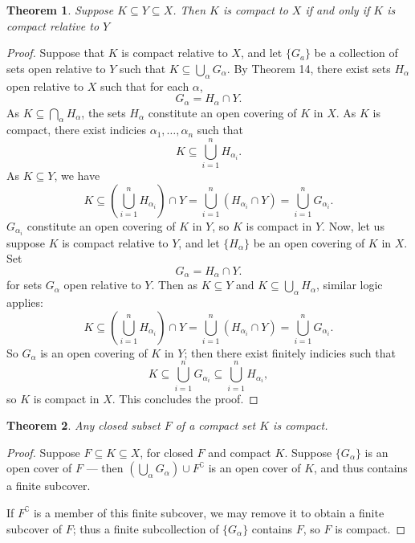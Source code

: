 \documentclass[11pt]{article}
\newtheorem{theorem}{Theorem}
\begin{document}
\begin{adjustwidth}{1cm}{}
	\begin{theorem}
		Suppose $K \subseteq Y \subseteq X$. Then $K$ is compact to $X$ if and only if $K$ is compact relative to $Y$
	\end{theorem}
	\begin{proof}
		Suppose that $K$ is compact relative to $X$, and let $\{ G_{a} \}$ be a collection of sets open relative to $Y$ such that $K \subseteq \bigcup_{\alpha} G_{\alpha}$. By Theorem 14, there exist sets $H_{\alpha}$ open relative to $X$ such that for each $\alpha$,
		\[
			G_{\alpha} = H_{\alpha} \cap Y.
		\]
		As $K \subseteq \bigcap_{\alpha} H_{\alpha}$, the sets $H_{\alpha}$ constitute an open covering of $K$ in $X$. As $K$ is compact, there exist indicies $\alpha_{1}, \ldots, \alpha_{n}$ such that
		\[
			K \subseteq \bigcup\limits_{i = 1}^{n} H_{\alpha_{i}}.
		\]
		As $K \subseteq Y$, we have
		\[
			K \subseteq \left( \bigcup\limits_{i = 1}^{n} H_{\alpha_{i}} \right) \cap Y = \bigcup\limits_{i = 1}^{n} (H_{\alpha_{i}} \cap Y) = \bigcup\limits_{i = 1}^{n} G_{\alpha_{i}}.
		\]
		$G_{\alpha_{i}}$ constitute an open covering of $K$ in $Y$, so $K$ is compact in $Y$. Now, let us suppose $K$ is compact relative to $Y$, and let $\{ H_{\alpha} \}$ be an open covering of $K$ in $X$. Set
		\[
			G_{\alpha} = H_{\alpha} \cap Y.
		\]
		for sets $G_{\alpha}$ open relative to $Y$. Then as $K \subseteq Y$ and $K \subseteq \bigcup_{\alpha} H_{\alpha}$, similar logic applies:
		\[
			K \subseteq \left( \bigcup\limits_{i = 1}^{n} H_{\alpha_{i}} \right) \cap Y = \bigcup\limits_{i = 1}^{n} (H_{\alpha_{i}} \cap Y) = \bigcup\limits_{i = 1}^{n} G_{\alpha_{i}}.
		\]
		So $G_{\alpha}$ is an open covering of $K$ in $Y$; then there exist finitely indicies such that
		\[
			K \subseteq \bigcup\limits_{i = 1}^{n} G_{\alpha_{i}} \subseteq \bigcup\limits_{i = 1}^{n} H_{\alpha_{i}},
		\]
		so $K$ is compact in $X$. This concludes the proof.
	\end{proof}
\end{adjustwidth}

\begin{theorem}
	Any closed subset $F$ of a compact set $K$ is compact.
\end{theorem}
\begin{adjustwidth}{1cm}{}
	\begin{proof}
		Suppose $F \subseteq K \subseteq X$, for closed $F$ and compact $K$. Suppose $\{ G_{\alpha} \}$ is an open cover of $F$ --- then $\left( \bigcup_{\alpha} G_{\alpha} \right) \cup F^{\complement}$ is an open cover of $K$, and thus contains a finite subcover.

		If $F^{\complement}$ is a member of this finite subcover, we may remove it to obtain a finite subcover of $F$; thus a finite subcollection of $\{ G_{\alpha} \}$ contains $F$, so $F$ is compact.
	\end{proof}
\end{adjustwidth}
\end{document}
